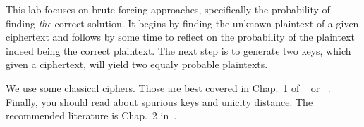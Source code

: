 This lab focuses on brute forcing approaches, specifically the probability of 
finding \emph{the} correct solution.
It begins by finding the unknown plaintext of a given ciphertext and follows by
some time to reflect on the probability of the plaintext indeed being the 
correct plaintext.
The next step is to generate two keys, which given a ciphertext, will yield two
equaly probable plaintexts.

We use some classical ciphers.
Those are best covered in Chap.~1 of 
~\cite{Stinson2006cta} or 
~\cite{Bosk2013itn}.
Finally, you should read about spurious keys and unicity distance.
The recommended literature is Chap.~2 in~\cite{Stinson2006cta}.
